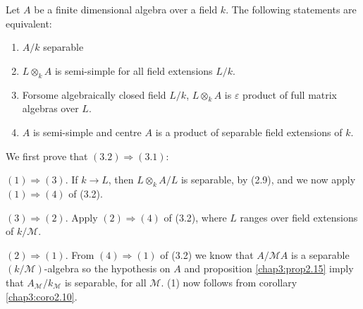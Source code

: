 \setcounter{theorem}{1}
    \begin{theorem}\label{chap3:thm3.2}%
Let $A$ be a finite dimensional algebra over a field $k$. The
following statements are equivalent: 
 \begin{enumerate}[(1)]
\item $A/k$ separable 

\item $L \otimes_k A$ is semi-simple for all field extensions
  $L/k$.
 
\item For\pageoriginale some algebraically closed field $L /k$, $L
  \otimes_k A$ is $\varepsilon$ product of full matrix
    algebras over $L$. 

\item $A$ is semi-simple and centre $A$ is  a product
  of separable field extensions of $k$. 
 \end{enumerate}
    \end{theorem}

    We first prove that $(3.2) \Rightarrow (3.1)$: 
    
    $(1) \Rightarrow (3)$. If $k \to L$, then $L \otimes_k  A/L$ is
    separable, by (2.9), and we now apply $(1) \Rightarrow (4)$ of
    (3.2). 
    
    $(3) \Rightarrow (2)$. Apply $(2) \Rightarrow (4)$ of (3.2),
    where $L$ ranges over field extensions of $k / \mathscr{M}$. 
    
    $(2) \Rightarrow (1)$. From $(4) \Rightarrow (1)$ of (3.2) we
    know that $A/ \mathscr{M} A$ is a separable $(k/
    \mathscr{M})$-algebra so the hypothesis on $A$ and proposition
    \ref{chap3:prop2.15} imply that  $A_{\mathscr{M}} / k_{\mathscr{M}}$ is
    separable, for all $\mathscr{M}$. (1) now follows from corollary
    \ref{chap3:coro2.10}. 

